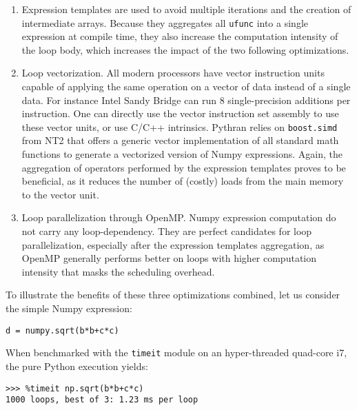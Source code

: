\documentclass[10pt, onecolumn, preprint]{sigplanconf}
\begin{document}
\begin{enumerate}

    \item Expression templates\cite{expression_templates} are used to avoid
        multiple iterations and the creation of intermediate arrays. Because
        they aggregates all \texttt{ufunc} into a single expression at compile
        time, they also increase the computation intensity of the loop body,
        which increases the impact of the two following optimizations.

    \item Loop vectorization. All modern processors have vector instruction
        units capable of applying the same operation on a vector of data
        instead of a single data. For instance Intel Sandy Bridge can run 8
        single-precision additions per instruction. One can directly use the
        vector instruction set assembly to use these vector units, or use C/C++
        intrinsics. Pythran relies on \texttt{boost.simd} from NT2 that offers
        a generic vector implementation of all standard math functions to
        generate a vectorized version of Numpy expressions. Again, the
        aggregation of operators performed by the expression templates proves
        to be beneficial, as it reduces the number of (costly) loads from the
        main memory to the vector unit.

    \item Loop parallelization through OpenMP\cite{openmp3.1}. Numpy expression
        computation do not carry any loop-dependency. They are perfect
        candidates for loop parallelization, especially after the expression
        templates aggregation, as OpenMP generally performs better on loops
        with higher computation intensity that masks the scheduling overhead.

\end{enumerate}

To illustrate the benefits of these three optimizations combined, let us
consider the simple Numpy expression:

\begin{lstlisting}
d = numpy.sqrt(b*b+c*c)
\end{lstlisting}

When benchmarked with the \texttt{timeit} module on an hyper-threaded quad-core i7, the
pure Python execution yields:

\begin{lstlisting}
>>> %timeit np.sqrt(b*b+c*c)
1000 loops, best of 3: 1.23 ms per loop
\end{lstlisting}
\end{document}
